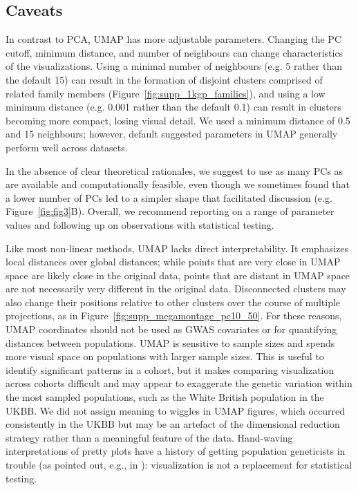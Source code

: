 \subsection{Caveats}
In contrast to PCA, UMAP has more adjustable parameters. Changing the PC cutoff, minimum distance, and number of neighbours can change characteristics of the visualizations. Using a minimal number of neighbours (e.g. 5 rather than the default 15) can result in the formation of disjoint clusters comprised of related family members (Figure~\ref{fig:supp_1kgp_families}), and using a low minimum distance (e.g. 0.001 rather than the default 0.1) can result in clusters becoming more compact, losing visual detail. We used a minimum distance of 0.5 and 15 neighbours; however, default suggested parameters in UMAP generally perform well across datasets. 

In the absence of clear theoretical rationales, we suggest to use as many PCs as are available and computationally feasible, even though we sometimes found that a lower number of PCs led to a simpler shape that facilitated discussion (e.g. Figure~\ref{fig:fig3}B). Overall, we recommend reporting on a range of parameter values and following up on observations with statistical testing. 

Like most non-linear methods, UMAP lacks direct interpretability. It emphasizes local distances over global distances; while points that are very close in UMAP space are likely close in the original data, points that are distant in UMAP space are not necessarily very different in the original data. Disconnected clusters may also change their positions relative to other clusters over the course of multiple projections, as in Figure~\ref{fig:supp_megamontage_pc10_50}. For these reasons, UMAP coordinates should not be used as GWAS covariates or for quantifying distances between populations. UMAP is sensitive to sample sizes and spends more visual space on populations with larger sample sizes. This is useful to identify significant patterns in a cohort, but it makes comparing visualization across cohorts difficult and may appear to exaggerate the genetic variation within the most sampled populations, such as the White British population in the UKBB. We did not assign meaning to wiggles in UMAP figures, which occurred consistently in the UKBB but may be an artefact of the dimensional reduction strategy rather than a meaningful feature of the data. Hand-waving interpretations of pretty plots have a history of getting population geneticists in trouble (as pointed out, e.g., in \citep{novembre2008interpreting}): visualization is not a replacement for statistical testing.

